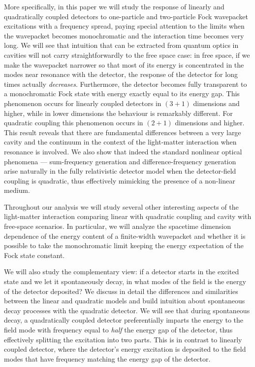 \documentclass[prd,twocolumn,superscriptaddress,nofootinbib,floatfix,amsmath,amssymb]{revtex4-2}
\begin{document}
    More specifically, in this paper we will study the response of linearly and quadratically coupled detectors to one-particle and two-particle Fock wavepacket excitations with a frequency spread, paying special attention to the limits when the wavepacket becomes monochromatic and the interaction time becomes very long. We will see that intuition that can be extracted from quantum optics in cavities will not carry straightforwardly to the free space case: in free space, if we make the wavepacket narrower so that most of its energy is concentrated in the modes near resonance with the detector, the response of the detector for long times actually \textit{decreases}. Furthermore, the detector becomes fully transparent to a monochromatic Fock state with energy exactly equal to its energy gap. This phenomenon occurs for linearly coupled detectors in $(3+1)$ dimensions and higher, while in lower dimensions the behaviour is remarkably different. For quadratic coupling this phenomenon occurs in $(2+1)$ dimensions and higher. This result reveals that there are fundamental differences between a very large cavity and the continuum in the context of the light-matter interaction when resonance is involved. We also show that indeed the standard nonlinear optical phenomena --- {sum-frequency generation} and {difference-frequency generation} arise naturally in the fully relativistic detector model when the detector-field coupling is quadratic, thus effectively mimicking the presence of a non-linear medium.
    
    Throughout our analysis we will study several other interesting aspects of the light-matter interaction comparing linear with quadratic coupling and cavity with free-space scenarios. In particular, we will analyze the spacetime dimension dependence of the energy content of a finite-width wavepacket and whether it is possible to take the monochromatic limit keeping the energy expectation of the Fock state constant. 
    
    We will also study the complementary view: if a detector starts in the excited state and we let it spontaneously decay, in what modes of the field is the energy of the detector deposited? We discuss in detail the differences and similarities between the linear and quadratic models and build intuition about spontaneous decay processes with the quadratic detector. We will see that during spontaneous decay, a quadratically coupled detector preferentially imparts the energy to the field mode with frequency equal to \textit{half} the energy gap of the detector, thus effectively splitting the excitation into two parts. This is in contrast to linearly coupled detector, where the detector's energy excitation is deposited to the field modes that have frequency matching the energy gap of the detector.
    
\end{document}
